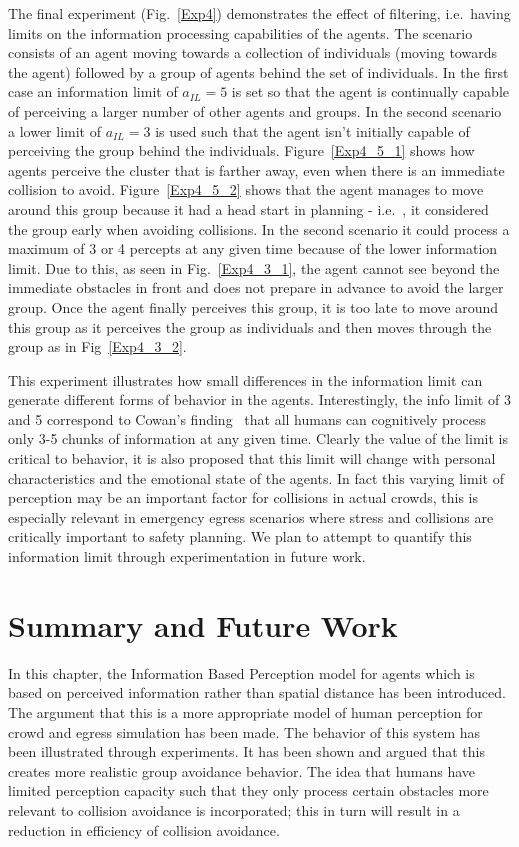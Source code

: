 The final experiment (Fig.~\ref{Exp4}) demonstrates the effect of filtering, i.e.\ having limits on the information processing capabilities of the agents. The scenario consists of an agent moving towards a collection of individuals (moving towards the agent) followed by a group of agents behind the set of individuals. In the first case an information limit of $a_{IL} = 5$ is set so that the agent is continually capable of perceiving a larger number of other agents and groups. In the second scenario a lower limit of $a_{IL} = 3$ is used such that the agent isn't initially capable of perceiving the group behind the individuals. Figure~\ref{Exp4_5_1} shows how agents perceive the cluster that is farther away, even when there is an immediate collision to avoid. Figure~\ref{Exp4_5_2} shows that the agent manages to move around this group because it had a head start in planning - i.e.\ , it considered the group early when avoiding collisions. In the second scenario it could process a maximum of 3 or 4 percepts at any given time because of the lower information limit. Due to this, as seen in Fig.~\ref{Exp4_3_1}, the agent cannot see beyond the immediate obstacles in front and does not prepare in advance to avoid the larger group. Once the agent finally perceives this group, it is too late to move around this group as it perceives the group as individuals and then moves through the group as in Fig~\ref{Exp4_3_2}. 

This experiment illustrates how small differences in the information limit can generate different forms of behavior in the agents. Interestingly, the info limit of 3 and 5 correspond to Cowan's finding~\cite{Cowan:2001wi} that all humans can cognitively process only 3-5 chunks of information at any given time. Clearly the value of the limit is critical to behavior, it is also proposed that this limit will change with personal characteristics and the emotional state of the agents. In fact this varying limit of perception may be an important factor for collisions in actual crowds, this is especially relevant in emergency egress scenarios where stress and collisions are critically important to safety planning. We plan to attempt to quantify this information limit through experimentation in future work.

\section{Summary and Future Work}
\label{IBP:Conclusion}
In this chapter, the Information Based Perception model for agents which is based on perceived information rather than spatial distance has been introduced. The argument that this is a more appropriate model of human perception for crowd and egress simulation has been made. The behavior of this system has been illustrated through experiments. It has been shown and argued that this creates more realistic group avoidance behavior. The idea that humans have limited perception capacity such that they only process certain obstacles more relevant to collision avoidance is incorporated; this in turn will result in a reduction in efficiency of collision avoidance.

